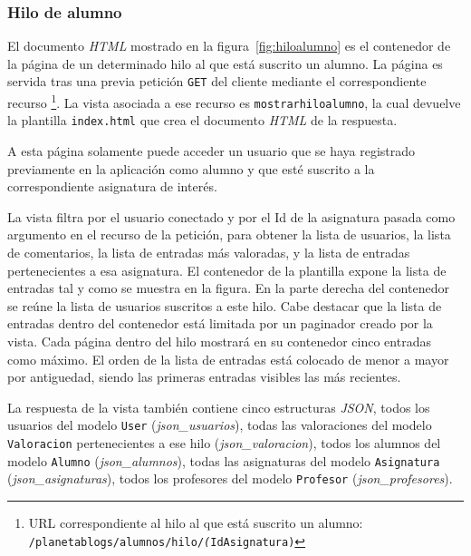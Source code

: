 \documentclass[a4paper, 12pt]{book}
\begin{document}
\subsubsection{Hilo de alumno} 
\label{sec:hiloalumno}
El documento \textit{HTML} mostrado en la figura~\ref{fig:hiloalumno} es el contenedor de la p\'agina de un determinado hilo al que est\'a suscrito un alumno. 
La p\'agina es servida tras una previa petici\'on \texttt{GET} del cliente mediante el correspondiente recurso \footnote{URL correspondiente al hilo al que est\'a
suscrito un alumno: \texttt{/planetablogs/alumnos/hilo/\textit(IdAsignatura)}}. La vista asociada a ese recurso es \texttt{mostrarhiloalumno}, la cual 
devuelve la plantilla \texttt{index.html} que crea el documento \textit{HTML} de la respuesta.

A esta p\'agina solamente puede acceder un usuario que se haya registrado previamente en la aplicaci\'on como alumno y que est\'e suscrito a la
correspondiente asignatura de inter\'es.

La vista filtra por el usuario conectado y por el Id de la asignatura pasada como argumento en el recurso de la petici\'on, para obtener la lista de 
usuarios, la lista de comentarios, la lista de entradas m\'as valoradas, y la lista de entradas pertenecientes a esa asignatura. 
El contenedor de la plantilla expone la lista de entradas tal y como se muestra en la figura. En la parte derecha del contenedor se re\'une la lista de 
usuarios suscritos a este hilo. Cabe destacar que la lista de entradas dentro del contenedor est\'a limitada por un paginador creado por la vista. Cada 
p\'agina dentro del hilo mostrar\'a en su contenedor cinco entradas como m\'aximo. El orden de la lista de entradas est\'a colocado de menor a mayor por 
antiguedad, siendo las primeras entradas visibles las m\'as recientes.

La respuesta de la vista tambi\'en contiene cinco estructuras \textit{JSON}, todos los usuarios del modelo \texttt{User} (\textit{json\_usuarios}), 
todas las valoraciones del modelo \texttt{Valoracion} pertenecientes a ese hilo (\textit{json\_valoracion}), todos los alumnos del modelo \texttt{Alumno} 
(\textit{json\_alumnos}), todas las asignaturas del modelo \texttt{Asignatura} (\textit{json\_asignaturas}), todos los profesores del modelo \texttt{Profesor} 
(\textit{json\_profesores}).
\end{document}
